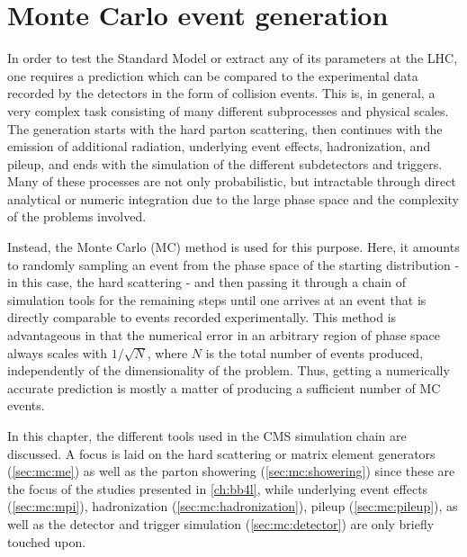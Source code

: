\chapter{Monte Carlo event generation}
\label{ch:mc}


In order to test the Standard Model or extract any of its parameters at the LHC, one requires a prediction which can be compared to the experimental data recorded by the detectors in the form of collision events. This is, in general, a very complex task consisting of many different subprocesses and physical scales. The generation starts with the hard parton scattering, then continues with the emission of additional radiation, underlying event effects, hadronization, and pileup, and ends with the simulation of the different subdetectors and triggers. Many of these processes are not only probabilistic, but intractable through direct analytical or numeric integration due to the large phase space and the complexity of the problems involved.

Instead, the Monte Carlo (MC) method is used for this purpose. Here, it amounts to randomly sampling an event from the phase space of the starting distribution - in this case, the hard scattering - and then passing it through a chain of simulation tools for the remaining steps until one arrives at an event that is directly comparable to events recorded experimentally. %
This method is advantageous in that the numerical error in an arbitrary region of phase space always scales with $1/\sqrt{N}$, where $N$ is the total number of events produced, independently of the dimensionality of the problem. Thus, getting a numerically accurate prediction is mostly a matter of producing a sufficient number of MC events.

In this chapter, the different tools used in the CMS simulation chain are discussed. A focus is laid on the hard scattering or matrix element generators (\cref{sec:mc:me}) as well as the parton showering (\cref{sec:mc:showering}) since these are the focus of the studies presented in \cref{ch:bb4l}, while underlying event effects (\cref{sec:mc:mpi}), hadronization (\cref{sec:mc:hadronization}), pileup (\cref{sec:mc:pileup}), as well as the detector and trigger simulation (\cref{sec:mc:detector}) are only briefly touched upon. 

